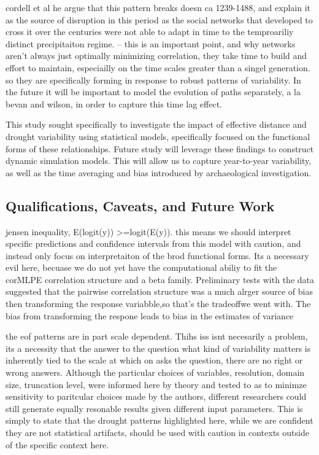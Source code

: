 \documentclass[fleqn,10pt]{wlscirep}
\begin{document}
cordell et al he argue that this pattern breaks doesn ca 1239-1488, and explain it as the source of disruption in this period as the social networks that developed to cross it over the centuries were not able to adapt in time to the temproariliy distinct precipitaiton regime. -- this is an important point, and why networks aren't always just optimally minimizing correlation, they take time to build and effort to maintain, especiailly on the time scales greater than a singel generation. so they are specifically forming in response to robust patterns of variability. In the future it will be important to model the evolution of paths separately, a la bevan and wilson, in order to capture this time lag effect.

This study sought specifically to investigate the impact of effective distance and drought variability using statistical models, specifically focused on the functional forms of these relationships. Future study will leverage these findings to construct dynamic simulation models. This will allow us to capture year-to-year variability, as well as the time averaging and bias introduced by archaeological investigation.

\subsection*{Qualifications, Caveats, and Future Work}
jensen inequality, E(logit(y)) >=logit(E(y)). this means we should interpret specific predictions and confidence intervals from this model with caution, and instead only focus on interpretaiton of the brod functional forms. Its a necessary evil here, becuase we do not yet have the computational abiliy to fit the corMLPE correlation structure and a beta family. Preliminary tests with the data suggested that the pairwise correlation structure was a much alrger source of bias then transforming the response variabble,so that's the tradeoffwe went with. The bias from transforming the respone leads to bias in the estimates of variance

the eof patterns are in part scale dependent. Thihs iss isnt necesarily a problem, its a necessity that the answer to the question what kind of variability matters is inherently tied to the scale at which on asks the question, there are no right or wrong answers. Although the particular choices of variables, resolution, domain size, truncation level, were informed here by theory and tested to as to minimze sensitivity to paritcular choices made by the authors, different researchers could still generate equally resonable results given  different input parameters.  This is simply to state that the drought patterns highlighted here, while we are confident they are not statistical artifacts, should be used with caution in contexts outside of the specific context here.
\end{document}
